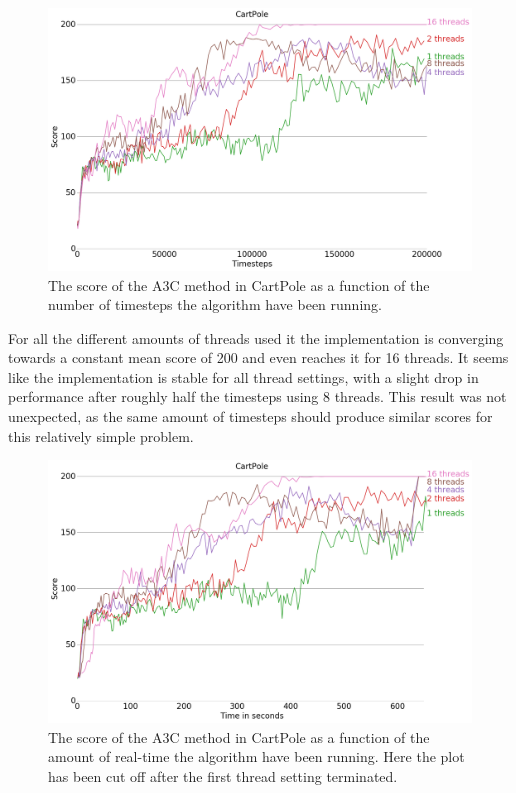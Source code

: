 \documentclass[11pt]{article}
\begin{document}
\begin{figure}[H]
    \centering
    \includegraphics[scale=0.4]{plots/cartpole_compare_counter_without_AC.png}
    \caption{The score of the A3C method in CartPole as a function
    of the number of timesteps the algorithm have been running.}
    \label{fig:a3c_time_steps}
\end{figure}

For all the different amounts of threads used it the implementation
is converging towards a constant mean score of 200 and even reaches
it for 16 threads.
It seems like the implementation is stable for all thread settings, with a slight
drop in performance after roughly half the timesteps using 8 threads.
This result was not unexpected, as the same amount of timesteps should produce similar
scores for this relatively simple problem.

\begin{figure}[H]
    \centering
    \includegraphics[scale=0.4]{plots/cartpole_compare_time_without_AC.png}
    \caption{The score of the A3C method in CartPole as a function
    of the amount of real-time the algorithm have been running.
    Here the plot has been cut off after the first thread setting
    terminated.}
    \label{fig:a3c_time}
\end{figure}
\end{document}
